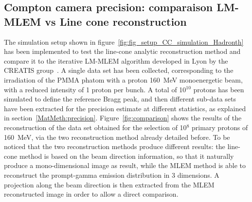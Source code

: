\subsection{Compton camera precision: comparaison LM-MLEM vs Line cone reconstruction}
\label{Results::precision_reconstruction}

The simulation setup shown in figure~\ref{fig:fig_setup_CC_simulation_Hadronth} has been implemented to test the line-cone analytic reconstruction method and compare it to the iterative LM-MLEM algorithm developed in Lyon by the CREATIS group~\cite{maxim_filtered_2014,hilaire_compton_2014}. A single data set has been collected, corresponding to the irradiation of the PMMA phatom with a proton 160~MeV monoenergetic beam, with a reduced intensity of 1 proton per bunch. A total of 10$^{10}$ protons has been simulated to define the reference Bragg peak, and then different sub-data sets have been extracted for the precision estimate at different statistics, as explained in section~\ref{MatMeth:precision}. 
Figure~\ref{fig:comparison} shows the results of the reconstruction of the data set obtained for the selection of 10$^8$ primary protons of 160~MeV, via the two reconstruction method already detailed before. To be noticed that the two reconstruction methods produce different results: the line-cone method is based on the beam direction information, so that it naturally produce a mono-dimensional image as result, while the MLEM method is able to reconstruct the prompt-gamma emission distribution in 3 dimensions. A projection along the beam direction is then extracted from the MLEM reconstructed image in order to allow a direct comparison.\\  

